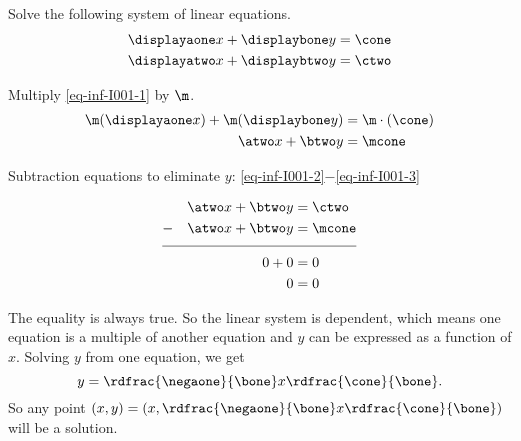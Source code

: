 




\pgfmathtruncatemacro{\negaone}{-\aone}


\pgfmathtruncatemacro{\mcone}{\m*\cone}



\pgfmathtruncatemacro{\atwo}{\m*\aone} %
\pgfmathtruncatemacro{\btwo}{\m*\bone}
\pgfmathtruncatemacro{\ctwo}{\mcone}





\setcounter{equation}{0}



Solve the following system of linear equations.
\begin{align}
\displayaone x + \displaybone y &= \cone  \label{eq-inf-I001-1}\\
\displayatwo x + \displaybtwo y &= \ctwo  \label{eq-inf-I001-2}
\end{align}

\begin{solution}
		Multiply \eqref{eq-inf-I001-1} by $\m$.
		\begin{align}
		\m(\displayaone x) + \m(\displaybone y) &=\m\cdot(\cone) \nonumber \\
		\atwo x + \btwo y &= \mcone \label{eq-inf-I001-3}
		\end{align}
		
		Subtraction equations to eliminate $y$: \eqref{eq-inf-I001-2}$-$\eqref{eq-inf-I001-3} 

\begin{align}
&& \atwo x + \btwo y &= \ctwo \nonumber \\
-&& \atwo x + \btwo y &= \mcone  \nonumber\\[-0.5em]
\cline{1-4}
&& 0+0 &=0 \nonumber\\
&& 0&=0 \nonumber
\end{align}

The equality is always true. So the linear system is dependent, which means one equation is a multiple of another equation and $y$ can be expressed as a function of $x$. Solving $y$ from one equation, we get 
\[y=\rdfrac{\negaone}{\bone} x \rdfrac{\cone}{\bone}.\] So any point $(x, y)=(x, \rdfrac{\negaone}{\bone}x \rdfrac{\cone}{\bone})$ will be a solution.
\end{solution}
